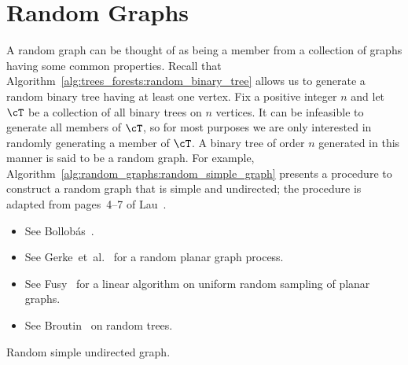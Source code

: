 
\chapter{Random Graphs}
\label{chap:random_graphs}

A random graph can be thought of as being a member
from a collection of graphs having some common properties. Recall that
Algorithm~\ref{alg:trees_forests:random_binary_tree} allows us to
generate a random binary tree having at least one vertex. Fix a
positive integer $n$ and let $\cT$ be a collection of all binary trees
on $n$ vertices. It can be infeasible to generate all members of
$\cT$, so for most purposes we are only interested in randomly
generating a member of $\cT$. A binary tree of order $n$ generated in
this manner is said to be a random graph. For
example, Algorithm~\ref{alg:random_graphs:random_simple_graph}
presents a procedure to construct a random graph that is simple and
undirected; the procedure is adapted from pages~4--7 of
Lau~\cite{Lau2007}.

\begin{itemize}
\item See Bollob{\'a}s~\cite{Bollobas2001}.

\item See Gerke~et~al.~\cite{GerkeEtAl2008} for a random planar graph
  process.

\item See Fusy~\cite{Fusy2009} for a linear algorithm on uniform
  random sampling of planar graphs.

\item See Broutin~\cite{Broutin2007} on random trees.
\end{itemize}

\begin{algorithm}[!htbp]

\caption{Random simple undirected graph.}
\label{alg:random_graphs:random_simple_graph}
\end{algorithm}


